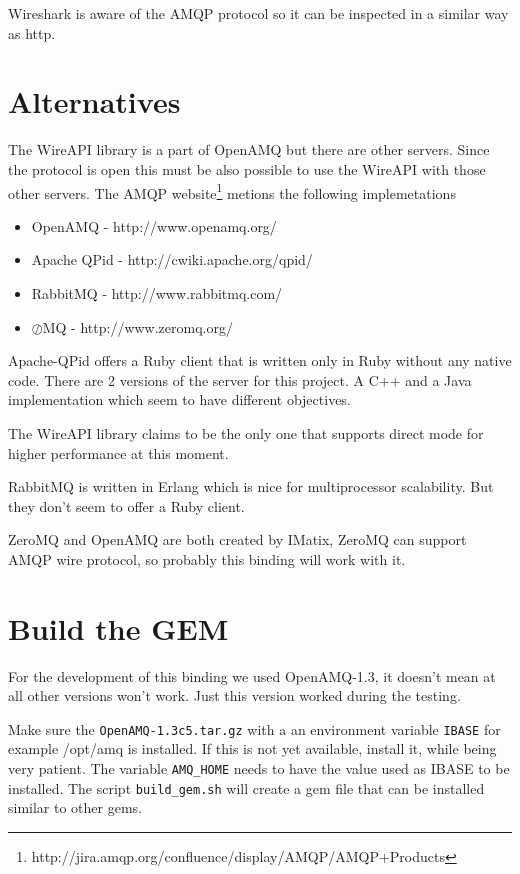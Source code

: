\documentclass[a4paper,twoside]{article}
\begin{document}
Wireshark is aware of the AMQP protocol so it can be inspected in a
similar way as http.



\section{Alternatives}

The WireAPI library is a part of OpenAMQ but there are other
servers. Since the protocol is open this must be also possible
to use the WireAPI with those other servers. The AMQP
website\footnote{http://jira.amqp.org/confluence/display/AMQP/AMQP+Products} 
metions the following implemetations

\begin{itemize}
  \item OpenAMQ -  http://www.openamq.org/
  \item Apache QPid - http://cwiki.apache.org/qpid/
  \item RabbitMQ - http://www.rabbitmq.com/
  \item $\oslash$MQ - http://www.zeromq.org/
\end{itemize}

Apache-QPid offers a Ruby client that is written 
only in Ruby without any native code. There are 2 versions of 
the server for this project. A C++ and a Java implementation which
seem to have different objectives.

The WireAPI library claims to be the only one that supports direct 
mode for higher performance at this moment.

RabbitMQ is written in Erlang which is nice for multiprocessor 
scalability. But they don't seem to offer a Ruby client.

ZeroMQ and OpenAMQ are both created by IMatix, ZeroMQ can support 
AMQP wire protocol, so probably this binding will work with it.



\section{Build the GEM}

For the development of this binding we used OpenAMQ-1.3, it 
doesn't mean at all other versions won't work. Just this 
version worked during the testing.

Make sure the {\tt OpenAMQ-1.3c5.tar.gz} with a an environment
variable {\tt IBASE} for example /opt/amq is installed. If this 
is not yet available, install it, while being very patient. The 
variable {\tt AMQ\_HOME} needs to have the value used as IBASE 
to be installed. The script {\tt build\_gem.sh} will create a 
gem file that can be installed similar to other gems. 
\end{document}
